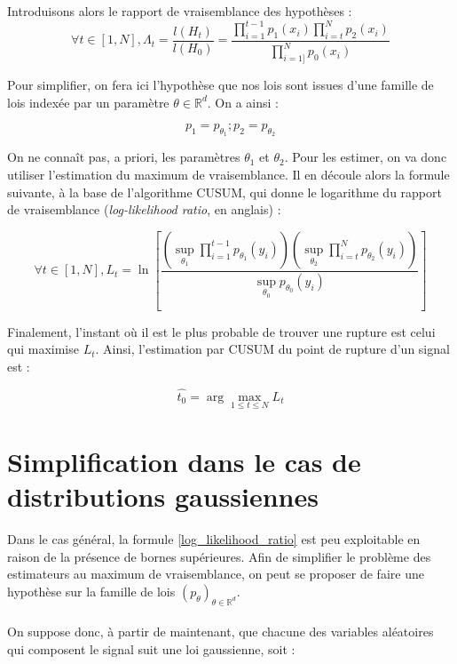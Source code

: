 \documentclass[french,12pt,notitlepage]{report}
\begin{document}
	Introduisons alors le rapport de vraisemblance des hypothèses :
	\begin{equation}
		\forall t \in [1, N], \Lambda_t = \frac{l(H_t)}{l(H_0)} = \frac{\prod_{i = 1}^{t-1} p_1(x_i) \prod_{i = t}^{N} p_2(x_i)}{\prod_{i = 1]}^{N} p_0(x_i)}
	\end{equation}

	Pour simplifier, on fera ici l'hypothèse que nos lois sont issues d'une famille de lois indexée par un paramètre $\theta \in \mathbb{R}^d$. On a ainsi :

	\begin{equation*}
		p_1 = p_{\theta_1} ; p_2 = p_{\theta_2}
	\end{equation*}

	On ne connaît pas, a priori, les paramètres $\theta_1$ et $\theta_2$. Pour les estimer, on va donc utiliser l'estimation du maximum de vraisemblance. Il en découle alors la formule suivante, à la base de l'algorithme CUSUM, qui donne le logarithme du rapport de vraisemblance (\textit{log-likelihood ratio}, en anglais) :

	\begin{equation}
		\forall t \in [1, N], L_t=\ln\left[\frac{\left(\sup_{\theta_1}\prod_{i=1}^{t-1}p_{\theta_1}(y_i)\right)\left(\sup_{\theta_2}\prod_{i=t}^Np_{\theta_2}(y_i)\right)}{\sup_{\theta_0}p_{\theta_0}(y_i)}\right]
		\label{log_likelihood_ratio}
	\end{equation}

	Finalement, l'instant où il est le plus probable de trouver une rupture est celui qui maximise $L_t$. Ainsi, l'estimation par CUSUM du point de rupture d'un signal est :

	\begin{equation}
		\hat{t_0}=\arg\max_{1\le t\le N}L_t
	\end{equation}

	\section{Simplification dans le cas de distributions gaussiennes}
	Dans le cas général, la formule \ref{log_likelihood_ratio} est peu exploitable en raison de la présence de bornes supérieures. Afin de simplifier le problème des estimateurs au maximum de vraisemblance, on peut se proposer de faire une hypothèse sur la famille de lois $(p_\theta)_{\theta \in \mathbb{R}^d}$.
	\\ \\
	On suppose donc, à partir de maintenant, que chacune des variables aléatoires qui composent le signal suit une loi gaussienne, soit :
\end{document}
